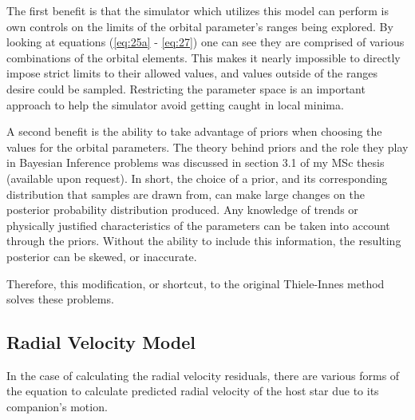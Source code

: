 \documentclass[12pt,preprint]{aastex}
\begin{document}
The first benefit is that the simulator which utilizes this model can perform is own controls on the limits of the orbital parameter's ranges being explored.  By looking at equations (\ref{eq:25a} - \ref{eq:27}) one can see they are comprised of various combinations of the orbital elements.  This makes it nearly impossible to directly impose strict limits to their allowed values, and values outside of the ranges desire could be sampled.  Restricting the parameter space is an important approach to help the simulator avoid getting caught in local minima.

A second benefit is the ability to take advantage of priors when choosing the values for the orbital parameters.  The theory behind priors and the role they play in Bayesian Inference problems was discussed in section 3.1 of my MSc thesis (available upon request).  In short, the choice of a prior, and its corresponding distribution that samples are drawn from, can make large changes on the posterior probability distribution produced.  Any knowledge of trends or physically justified characteristics of the parameters can be taken into account through the priors.  Without the ability to include this information, the resulting posterior can be skewed, or inaccurate.

Therefore, this modification, or shortcut, to the original Thiele-Innes method solves these problems.

\clearpage

\pagebreak

\subsection{Radial Velocity Model}\label{sec:RV-OrbModels}

In the case of calculating the radial velocity residuals, there are various forms of the equation to calculate predicted radial velocity of the host star due to its companion's motion.
\end{document}
